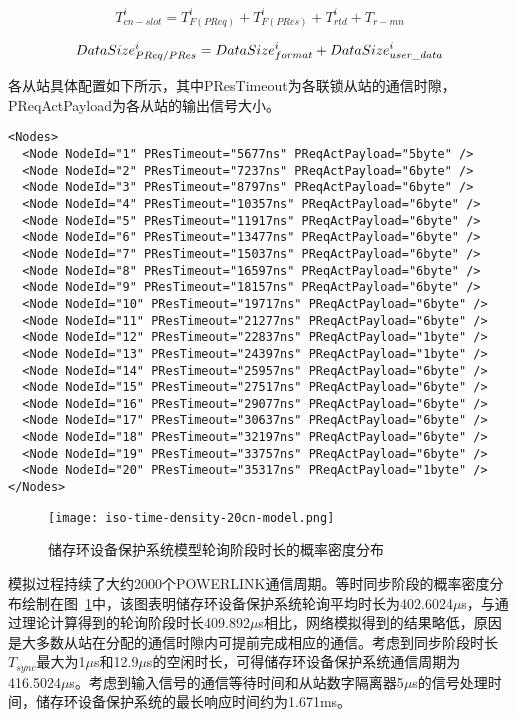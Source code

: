 \begin{equation}
\label{equation43}
T_{cn-slot}^{i}=T_{F(PReq)}^{i}+T_{F(PRes)}^{i}+T_{rtd}^{i}+T_{r-mn}
\end{equation}


\begin{equation}
\label{equation44}
DataSize_{PReq/PRes}^{i} = DataSize_{format}^{i}+DataSize_{user\_data}^{i}\\
\end{equation}

各从站具体配置如下所示，其中PResTimeout为各联锁从站的通信时隙，PReqActPayload为各从站的输出信号大小。

\begin{lstlisting}
<Nodes>
  <Node NodeId="1" PResTimeout="5677ns" PReqActPayload="5byte" />
  <Node NodeId="2" PResTimeout="7237ns" PReqActPayload="6byte" />
  <Node NodeId="3" PResTimeout="8797ns" PReqActPayload="6byte" />
  <Node NodeId="4" PResTimeout="10357ns" PReqActPayload="6byte" />
  <Node NodeId="5" PResTimeout="11917ns" PReqActPayload="6byte" />
  <Node NodeId="6" PResTimeout="13477ns" PReqActPayload="6byte" />
  <Node NodeId="7" PResTimeout="15037ns" PReqActPayload="6byte" />
  <Node NodeId="8" PResTimeout="16597ns" PReqActPayload="6byte" />
  <Node NodeId="9" PResTimeout="18157ns" PReqActPayload="6byte" />
  <Node NodeId="10" PResTimeout="19717ns" PReqActPayload="6byte" />
  <Node NodeId="11" PResTimeout="21277ns" PReqActPayload="6byte" />
  <Node NodeId="12" PResTimeout="22837ns" PReqActPayload="1byte" />
  <Node NodeId="13" PResTimeout="24397ns" PReqActPayload="1byte" />
  <Node NodeId="14" PResTimeout="25957ns" PReqActPayload="6byte" />
  <Node NodeId="15" PResTimeout="27517ns" PReqActPayload="6byte" />
  <Node NodeId="16" PResTimeout="29077ns" PReqActPayload="6byte" />
  <Node NodeId="17" PResTimeout="30637ns" PReqActPayload="6byte" />
  <Node NodeId="18" PResTimeout="32197ns" PReqActPayload="6byte" />
  <Node NodeId="19" PResTimeout="33757ns" PReqActPayload="6byte" />
  <Node NodeId="20" PResTimeout="35317ns" PReqActPayload="1byte" />
</Nodes>
\end{lstlisting}

\begin{figure}[!htb]
  \centering
  \texttt{[image: iso-time-density-20cn-model.png]}
  \caption{储存环设备保护系统模型轮询阶段时长的概率密度分布}
  \label{fig:iso-time-density-20cn-model}
\end{figure}

模拟过程持续了大约2000个POWERLINK通信周期。等时同步阶段的概率密度分布绘制在图~\ref{fig:iso-time-density-20cn-model}中，该图表明储存环设备保护系统轮询平均时长为402.6024$\mu$s，与通过理论计算得到的轮询阶段时长409.892$\mu$s相比，网络模拟得到的结果略低，原因是大多数从站在分配的通信时隙内可提前完成相应的通信。考虑到同步阶段时长$T_{sync}$最大为1$\mu$s和12.9$\mu$s的空闲时长，可得储存环设备保护系统通信周期为416.5024$\mu$s。考虑到输入信号的通信等待时间和从站数字隔离器5$\mu$s的信号处理时间，储存环设备保护系统的最长响应时间约为1.671ms。

